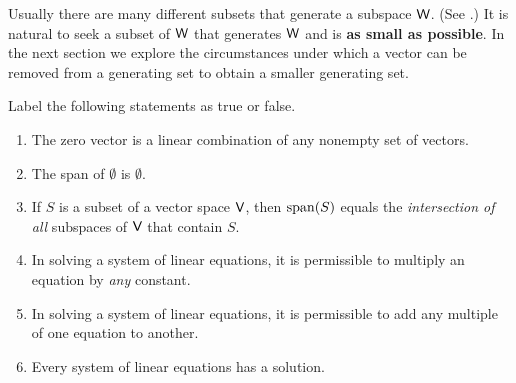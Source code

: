 \begin{remark} \label{remark 1.4.2}
Usually there are many different subsets that generate a subspace \(\textsf{W}\). (See .)
It is natural to seek a subset of \(\textsf{W}\) that generates \(\textsf{W}\) and is \textbf{as small as possible}.
In the next section we explore the circumstances under which a vector can be removed from a generating set to obtain a smaller generating set.
\end{remark}

\exercisesection

\begin{exercise} \label{exercise 1.4.1}
Label the following statements as true or false.
\begin{enumerate}
\item The zero vector is a linear combination of any nonempty set of vectors.
\item The span of \(\emptyset\) is \(\emptyset\).
\item If \(S\) is a subset of a vector space \(\textsf{V}\), then \(\operatorname{span}(S)\) equals the \emph{intersection of all} subspaces of \(\textsf{V}\) that contain \(S\).
\item In solving a system of linear equations, it is permissible to multiply an equation by \emph{any} constant.
\item In solving a system of linear equations, it is permissible to add any multiple of one equation to another.
\item Every system of linear equations has a solution. 
\end{enumerate}
\end{exercise}

